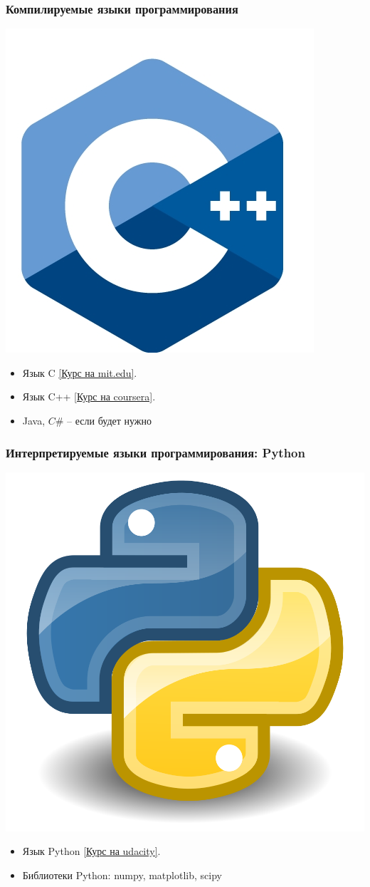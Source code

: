 \documentclass[14pt,pdf,hyperref={unicode}]{beamer}
\begin{document}
\begin{frame}[fragile]
\frametitle{Компилируемые языки программирования} 
\begin{center}
\includegraphics[width=0.2\linewidth]{images/cplusplus.jpg}
\end{center}
\begin{itemize}
\item Язык C
\href{http://ocw.mit.edu/courses/electrical-engineering-and-computer-science/6-087-practical-programming-in-c-january-iap-2010/}{[Курс на mit.edu]}. 
\item Язык C++
\href{http://ocw.mit.edu/courses/electrical-engineering-and-computer-science/6-087-practical-programming-in-c-january-iap-2010/}{[Курс на coursera]}. 
\item Java, $C\#$ -- если будет нужно
\end{itemize}
\end{frame}

\begin{frame}[fragile]
\frametitle{Интерпретируемые языки программирования: Python} 
\begin{center}
\includegraphics[width=0.2\linewidth]{images/python.png}
\end{center}
\begin{itemize}
\item Язык Python
\href{https://www.udacity.com/course/intro-to-computer-science--cs101}{[Курс на udacity]}.
\item Библиотеки Python: numpy, matplotlib, scipy
\end{itemize}
\end{frame}
\end{document}

